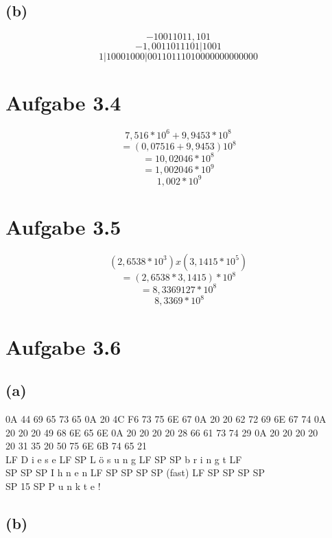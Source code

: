 \documentclass[12pt]{article}
\begin{document}
\subsection{(b)}
\[-10011011,101\]
\[-1,0011011101 | 1001\]
\[1 | 10001000 | 00110111010000000000000\]

\section{Aufgabe 3.4}
\[7,516 * 10^6 + 9,9453 * 10^8\]
\[= (0,07516 + 9,9453) 10^8\]
\[= 10,02046 * 10^8\]
\[= 1,002046 * 10^9\]
\[~ 1,002 * 10^9\]

\section{Aufgabe 3.5}
\[(2,6538 * 10^3) x (3,1415 * 10^5)\]
\[= (2,6538 * 3,1415) * 10^8\]
\[= 8,3369127 * 10^8\]
\[~ 8,3369 * 10^8\]

\section{Aufgabe 3.6}
\subsection{(a)}
0A 44 69 65 73 65 0A 20 4C F6 73 75 6E 67 0A 20 20 62 72 69 6E 67 74 0A \\
20 20 20 49 68 6E 65 6E 0A 20 20 20 20 28 66 61 73 74 29 0A 20 20 20 20 \\
20 31 35 20 50 75 6E 6B 74 65 21 \\
LF D i e s e LF SP  L ö s u n g LF SP SP b r i n g t LF \\
SP SP SP I h n e n LF SP SP SP SP (fast) LF SP SP SP SP \\
SP 15 SP P u n k t e !
\subsection{(b)}
\end{document}
